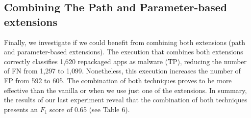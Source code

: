 \begin{table}[ht]
  \caption{Accuracy of the \mas with aid of complementary techniques (3,211 app pairs).}
  \label{tab:accuracyParameter}
\end{table}

\subsection{Combining The Path and Parameter-based extensions}

Finally, we investigate if we could benefit
from combining both extensions (path and parameter-based extensions).
The execution that combines both extensions correctly classifies 1,620 repackaged apps as malware (TP),
reducing the number of FN from 1,297 to 1,099. Nonetheless, this execution increases the number of FP from 592 to 605.
The combination of both techniques proves to be more effective than the vanilla \mas or when we use just one of the extensions.
In summary, the results of our last experiment reveal that the combination of both techniques presents an $F_1$ score of
0.65 (see Table 6).


